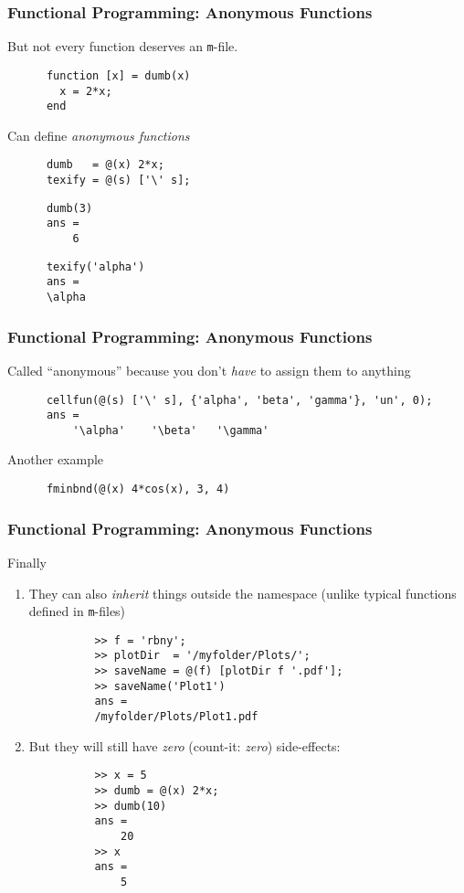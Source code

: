 \documentclass{beamer}
\begin{document}
  \begin{frame}[fragile]
    \frametitle{Functional Programming: Anonymous Functions}

    But not every function deserves an \texttt{m}-file.\pause
    \begin{lstlisting}
      function [x] = dumb(x)
        x = 2*x;
      end
    \end{lstlisting}\pause
    Can define \emph{anonymous functions}
    \begin{lstlisting}
      dumb   = @(x) 2*x;
      texify = @(s) ['\' s];
    \end{lstlisting}
    \begin{lstlisting}
      dumb(3)
      ans =
          6
    \end{lstlisting}
    \begin{lstlisting}
      texify('alpha')
      ans =
      \alpha
    \end{lstlisting}
	\end{frame}

  \begin{frame}[fragile]
    \frametitle{Functional Programming: Anonymous Functions}

    Called ``anonymous'' because you don't \emph{have} to assign them to
    anything
    \begin{lstlisting}
      cellfun(@(s) ['\' s], {'alpha', 'beta', 'gamma'}, 'un', 0);
      ans =
          '\alpha'    '\beta'   '\gamma'
    \end{lstlisting}\pause
    Another example
    \begin{lstlisting}
      fminbnd(@(x) 4*cos(x), 3, 4)
    \end{lstlisting}
	\end{frame}


  \begin{frame}[fragile]
    \frametitle{Functional Programming: Anonymous Functions}

    Finally
    \begin{enumerate}
      \item They can also \emph{inherit} things outside the namespace
        (unlike typical functions defined in \texttt{m}-files)
        \begin{lstlisting}
          >> f = 'rbny';
          >> plotDir  = '/myfolder/Plots/';
          >> saveName = @(f) [plotDir f '.pdf'];
          >> saveName('Plot1')
          ans =
          /myfolder/Plots/Plot1.pdf
        \end{lstlisting}\pause
      \item But they will still have \emph{zero} (count-it: \emph{zero})
        side-effects:
        \begin{lstlisting}
          >> x = 5
          >> dumb = @(x) 2*x;
          >> dumb(10)
          ans =
              20
          >> x
          ans =
              5
        \end{lstlisting}
    \end{enumerate}
	\end{frame}
\end{document}
